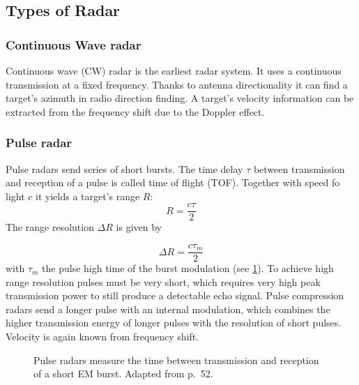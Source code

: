 \subsection{Types of Radar}\label{types-of-radar}

\subsubsection{Continuous Wave radar}\label{continuous-wave-cw-radar}

Continuous wave (CW) radar is the earliest radar system. It uses a continuous transmission
at a fixed frequency. Thanks to antenna directionality it can find a target's azimuth in radio direction finding. A target's velocity
information can be extracted from the frequency shift due to the Doppler
effect.

\subsubsection{Pulse radar}\label{pulse-radar}

Pulse radars send series of short bursts. The time delay \(\tau\)
between transmission and reception of a pulse is called time of flight
(TOF). Together with speed fo light $c$ it yields a target's range \(R\):
\begin{equation} \label{eq:tof}
	 R = \frac{c\tau}{2} 
\end{equation}
The range resolution \(\Delta R\) is given by

\begin{equation} \label{eq:tof_res}
	\Delta R = \frac{c\tau_m}{2}
\end{equation}
with \(\tau_m\) the pulse high time of the burst modulation (see \cref{fig:radar_pulse}). To
achieve high range resolution pulses must be very short, which requires
very high peak transmission power to still produce a detectable echo
signal. Pulse compression radars send a longer pulse with an internal
modulation, which combines the higher transmission energy of longer
pulses with the resolution of short pulses. Velocity is again known from
frequency shift.

\begin{figure}[htp]
    \centering
    \def\svgwidth{10cm}
    
    \caption{Pulse radars measure the time between transmission and reception of a short EM burst. Adapted from \cite{Adams2012} p.~52.} \label{fig:radar_pulse}
\end{figure}


